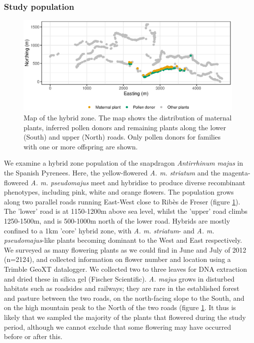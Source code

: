 \documentclass[10pt, a4paper, twocolumn]{article} %
\begin{document}
\subsubsection{Study population}

\begin{figure}
    \centering
	\includegraphics[]{map.eps} %
	\caption{
        Map of the hybrid zone.
        The map shows the distribution of maternal plants, inferred pollen donors and remaining plants along the lower (South) and upper (North) roads. Only pollen donors for families with one or more offspring are shown.}
	\label{fig:map} %
\end{figure}

We examine a hybrid zone population of the snapdragon \textit{Antirrhinum majus} in the Spanish Pyrenees. Here, the yellow-flowered \textit{A. m. striatum} and the magenta-flowered \textit{A. m. pseudomajus} meet and hybridise to produce diverse recombinant phenotypes, including pink, white and orange flowers.
The population grows along two parallel roads running East-West close to Rib\`{e}s de Freser (figure \ref{fig:map}). The ’lower’ road is at 1150-1200m above sea level, whilst the ’upper’ road climbs 1250-1500m, and is 500-1000m north of the lower road. Hybrids are mostly confined to a 1km ’core’ hybrid zone, with \textit{A. m. striatum}- and \textit{A. m. pseudomajus}-like plants becoming dominant to the West and East respectively. We surveyed as many flowering plants as we could find in June and July of 2012 (n=2124), and collected information on flower number and location using a Trimble GeoXT datalogger. We collected two to three leaves for DNA extraction and dried these in silica gel (Fischer Scientific). \textit{A. majus} grows in disturbed habitats such as roadsides and railways; they are rare in the established forest and pasture between the two roads, on the north-facing slope to the South, and on the high mountain peak to the North of the two roads (figure \ref{fig:map}. It thus is likely that we sampled the majority of the plants that flowered during the study period, although we cannot exclude that some flowering may have occurred before or after this. 
\end{document}
